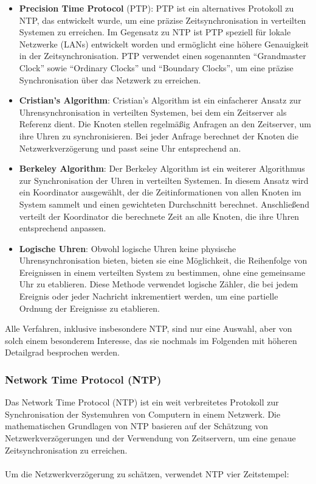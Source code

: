 \documentclass[../vs-script-first-v01.tex]{subfiles}
\begin{document}
\begin{itemize}
\item \textbf{Precision Time Protocol} (PTP): PTP ist ein alternatives Protokoll zu NTP, das entwickelt wurde, um eine präzise Zeitsynchronisation in verteilten Systemen zu erreichen. Im Gegensatz zu NTP ist PTP speziell für lokale Netzwerke (LANs) entwickelt worden und ermöglicht eine höhere Genauigkeit in der Zeitsynchronisation. PTP verwendet einen sogenannten \enquote{Grandmaster Clock} sowie \enquote{Ordinary Clocks} und \enquote{Boundary Clocks}, um eine präzise Synchronisation über das Netzwerk zu erreichen.
\item \textbf{Cristian's Algorithm}: Cristian's Algorithm ist ein einfacherer Ansatz zur Uhrensynchronisation in verteilten Systemen, bei dem ein Zeitserver als Referenz dient. Die Knoten stellen regelmäßig Anfragen an den Zeitserver, um ihre Uhren zu synchronisieren. Bei jeder Anfrage berechnet der Knoten die Netzwerkverzögerung und passt seine Uhr entsprechend an.
\item \textbf{Berkeley Algorithm}: Der Berkeley Algorithm ist ein weiterer Algorithmus zur Synchronisation der Uhren in verteilten Systemen. In diesem Ansatz wird ein Koordinator ausgewählt, der die Zeitinformationen von allen Knoten im System sammelt und einen gewichteten Durchschnitt berechnet. Anschließend verteilt der Koordinator die berechnete Zeit an alle Knoten, die ihre Uhren entsprechend anpassen.
\item \textbf{Logische Uhren}: Obwohl logische Uhren keine physische Uhrensynchronisation bieten, bieten sie eine Möglichkeit, die Reihenfolge von Ereignissen in einem verteilten System zu bestimmen, ohne eine gemeinsame Uhr zu etablieren. Diese Methode verwendet logische Zähler, die bei jedem Ereignis oder jeder Nachricht inkrementiert werden, um eine partielle Ordnung der Ereignisse zu etablieren.
\end{itemize}
Alle Verfahren, inklusive insbesondere NTP, sind nur eine Auswahl, aber von solch einem besonderem Interesse, das sie nochmals im Folgenden mit höheren Detailgrad besprochen werden.


\subsubsection{Network Time Protocol (NTP)}
Das Network Time Protocol (NTP) ist ein weit verbreitetes Protokoll zur Synchronisation der Systemuhren von Computern in einem Netzwerk. Die mathematischen Grundlagen von NTP basieren auf der Schätzung von Netzwerkverzögerungen und der Verwendung von Zeitservern, um eine genaue Zeitsynchronisation zu erreichen.
\\\\
Um die Netzwerkverzögerung zu schätzen, verwendet NTP vier Zeitstempel:
\end{document}
